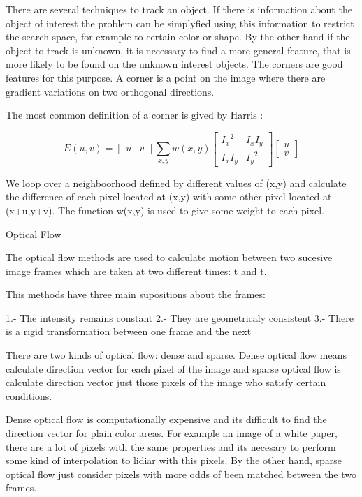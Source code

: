  


There are several techniques to track an object. If there is information about the object of interest the problem 
can be simplyfied using this information to restrict the search space, for example to certain color or shape.
 By the other hand if the object to track is unknown, it is necessary to find a more general feature, that is 
more likely to be found on the unknown interest objects. The corners are good features for this purpose. A corner 
is a point on the image where there are gradient variations on two orthogonal directions.

The most common definition of a corner is gived by Harris :

$$
E(u,v) = \begin{bmatrix} u & v \end{bmatrix} \sum\limits_{x,y} w(x,y) \begin{bmatrix} {I_x}^2 & I_x I_y \\ I_x I_y & {I_y}^2 \end{bmatrix} \begin{bmatrix} u \\ v \end{bmatrix}
$$

We loop over a neighboorhood defined by different values of (x,y) and calculate 
the difference of each pixel located at (x,y) with some other pixel located at (x+u,y+v). 
The function w(x,y) is used to give some weight to each pixel. 


Optical Flow

The optical flow methods are used to calculate motion between two sucesive image frames which are taken
 at two different times: t and \delta t.

This methods have three main supositions about the frames:

1.- The intensity remains constant
2.- They are geometricaly consistent
3.- There is a rigid transformation between one frame and the next

There are two kinds of optical flow: dense and sparse. Dense optical flow means  calculate direction vector for each pixel of the image and sparse optical flow is calculate direction vector just those pixels of the image 
who satisfy certain conditions.

Dense optical flow is computationally expensive and its difficult to find the direction vector for plain color areas. For example an image of a white paper, there are a lot of pixels with the same properties and its necesary to perform some kind of interpolation to lidiar with this pixels. By the other hand, sparse optical flow just consider pixels with more odds of been matched between the two frames.




